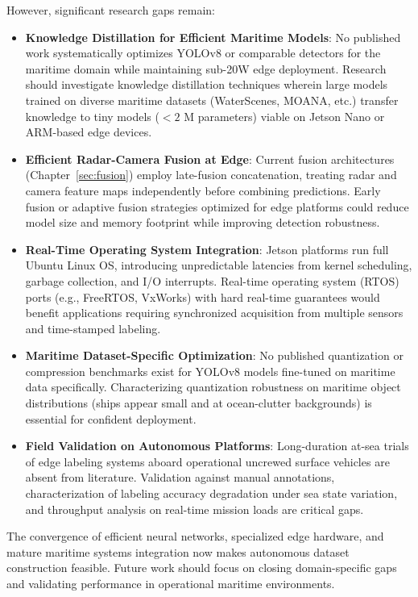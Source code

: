 However, significant research gaps remain:

\begin{itemize}
  \item \textbf{Knowledge Distillation for Efficient Maritime Models}: \cite{Zagoruyko2017KnowledgeDistillationSurvey,MDPI2024KnowledgeDistillation} No published work systematically optimizes YOLOv8 or comparable detectors for the maritime domain while maintaining sub-20W edge deployment. Research should investigate knowledge distillation techniques wherein large models trained on diverse maritime datasets (WaterScenes, MOANA, etc.) transfer knowledge to tiny models ($< 2$ M parameters) viable on Jetson Nano or ARM-based edge devices.

  \item \textbf{Efficient Radar-Camera Fusion at Edge}: \cite{Li2024EfficientDeepLearning,Cai2024EfficientInference} Current fusion architectures (Chapter~\ref{sec:fusion}) employ late-fusion concatenation, treating radar and camera feature maps independently before combining predictions. Early fusion or adaptive fusion strategies optimized for edge platforms could reduce model size and memory footprint while improving detection robustness.

  \item \textbf{Real-Time Operating System Integration}: \cite{BalasubramanianR2024RTOSSFramework} Jetson platforms run full Ubuntu Linux OS, introducing unpredictable latencies from kernel scheduling, garbage collection, and I/O interrupts. Real-time operating system (RTOS) ports (e.g., FreeRTOS, VxWorks) with hard real-time guarantees would benefit applications requiring synchronized acquisition from multiple sensors and time-stamped labeling.

  \item \textbf{Maritime Dataset-Specific Optimization}: \cite{MDPI2024EdgeAIPractice} No published quantization or compression benchmarks exist for YOLOv8 models fine-tuned on maritime data specifically. Characterizing quantization robustness on maritime object distributions (ships appear small and at ocean-clutter backgrounds) is essential for confident deployment.

  \item \textbf{Field Validation on Autonomous Platforms}: Long-duration at-sea trials of edge labeling systems aboard operational uncrewed surface vehicles are absent from literature. Validation against manual annotations, characterization of labeling accuracy degradation under sea state variation, and throughput analysis on real-time mission loads are critical gaps.
\end{itemize}

The convergence of efficient neural networks, specialized edge hardware, and mature maritime systems integration now makes autonomous dataset construction feasible. Future work should focus on closing domain-specific gaps and validating performance in operational maritime environments.
